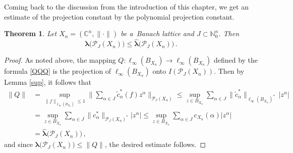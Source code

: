 \documentclass[12pt]{amsart}
\numberwithin{subsection}{section}
\newtheorem{theorem}{Theorem}[section]
\theoremstyle{definition}
\theoremstyle{remark}
\begin{document}

Coming back to the discussion from the introduction of  this chapter, we get an estimate of the projection constant by the
polynomial projection constant.


\begin{theorem} \label{lambda-dash}
Let $X_n = (\mathbb{C}^n,\|\cdot\|)$ be a~Banach lattice and  $J \subset \mathbb{N}_0^n$. Then
\[
\boldsymbol{\lambda}\big(\mathcal{P}_{J}
(X_n)\big) \leq \widehat{\boldsymbol{\lambda}}\big(\mathcal{P}_{J}(X_n)\big)\,.
\]
\end{theorem}


\begin{proof}
As noted above, the mapping $Q \colon \ell_\infty(B_{X_n}) \to \ell_\infty(B_{X_n})$ defined by the formula \eqref{QQQ} is
the projection of $\ell_\infty(B_{X_n})$ onto $I(\mathcal{P}_{J}(X_n))$. Then by Lemma \ref{sup}, it follows that
\begin{align*}
\|Q\| &=  \sup_{\|f\|_{\ell_{\infty}(B_{X_n})} \leq 1} \Big\|
\sum_{\alpha  \in J} \widetilde{c}^{\ast}_{\alpha} (f) z^\alpha\Big\|_{\mathcal{P}_J(X_n)}
\leq \sup_{z \in B_{X_n}} \sum_{\alpha\in J} \big\|\widetilde{c}^{\ast}_{\alpha} \big\|_{\ell_{\infty}(B_{X_n})^{*}}\,|z^\alpha|
\\
& = \sup_{z \in B_{X_n}} \sum_{\alpha\in J}  \big\|c^{\ast}_{\alpha}\big\|_{\mathcal P_J(X_n)^\ast}|z^\alpha|
\leq \sup_{z \in B_{X_n}} \sum_{\alpha\in J}  c_{X_n}(\alpha)|z^\alpha|
\\
& = \widehat{\boldsymbol{\lambda}}\big(\mathcal{P}_J(X_n)\big)\,,
\end{align*}
and since $\boldsymbol{\lambda}\big(\mathcal{P}_J (X_n)\big) \leq \|Q\|$, the desired estimate follows.
\end{proof}
\end{document}
